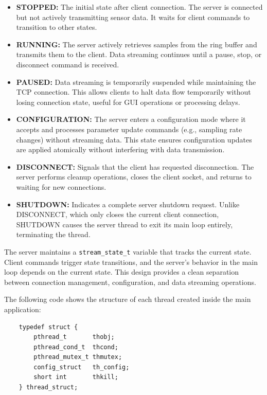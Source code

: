 \begin{itemize}
	\item \textbf{STOPPED:} The initial state after client connection. The server is connected but not actively transmitting sensor data. It waits for client commands to transition to other states.
	
	\item \textbf{RUNNING:} The server actively retrieves samples from the ring buffer and transmits them to the client. Data streaming continues until a pause, stop, or disconnect command is received.
	
	\item \textbf{PAUSED:} Data streaming is temporarily suspended while maintaining the TCP connection. This allows clients to halt data flow temporarily without losing connection state, useful for GUI operations or processing delays.
	
	\item \textbf{CONFIGURATION:} The server enters a configuration mode where it accepts and processes parameter update commands (e.g., sampling rate changes) without streaming data. This state ensures configuration updates are applied atomically without interfering with data transmission.
	
	\item \textbf{DISCONNECT:} Signals that the client has requested disconnection. The server performs cleanup operations, closes the client socket, and returns to waiting for new connections.
	
	\item \textbf{SHUTDOWN:} Indicates a complete server shutdown request. Unlike DISCONNECT, which only closes the current client connection, SHUTDOWN causes the server thread to exit its main loop entirely, terminating the thread.
\end{itemize}

The server maintains a \texttt{stream\_state\_t} variable that tracks the current state. Client commands trigger state transitions, and the server's behavior in the main loop depends on the current state. This design provides a clean separation between connection management, configuration, and data streaming operations.

The following code shows the structure of each thread created inside the main application: 
\begin{verbatim}
	typedef struct {
		pthread_t       thobj;
		pthread_cond_t  thcond;
		pthread_mutex_t thmutex;
		config_struct   th_config;
		short int       thkill;
	} thread_struct;
\end{verbatim}


